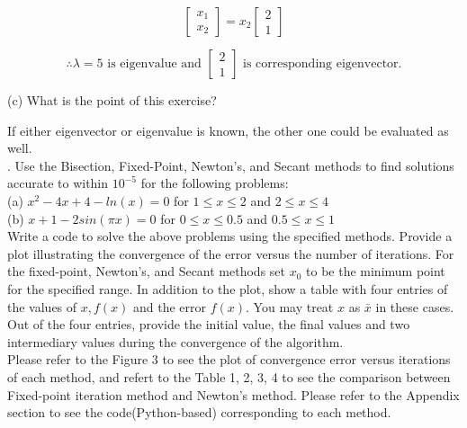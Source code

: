 \documentclass{article} %
\begin{document}
{    \[
        \begin{bmatrix}
        x_1 \\
        x_2 
        \end{bmatrix}
        =
        x_2
        \begin{bmatrix}
        2 \\
        1 
        \end{bmatrix}
    \]

    \[
        \therefore \lambda = 5 \text{ is eigenvalue and } 
        \begin{bmatrix}
            2 \\
            1
        \end{bmatrix} \text{ is corresponding eigenvector.}
    \]

    \noindent (c) What is the point of this exercise?

    If either eigenvector or eigenvalue is known, the other one could be evaluated as well.\\

    . Use the Bisection, Fixed-Point, Newton’s, and Secant methods to find solutions accurate to within 
    $ 10^{-5} $ for the following problems: \\
    (a) $ x^2 - 4x + 4 - ln(x) = 0 $ for $ 1 \leq x \leq 2 $ and $ 2 \leq x \leq 4 $ \\
    (b) $ x + 1 - 2sin(\pi x) = 0 $ for $ 0 \leq x \leq 0.5 $ and $ 0.5 \leq x \leq 1 $ \\
    Write a code to solve the above problems using the specified methods. Provide a plot illustrating the
    convergence of the error versus the number of iterations. For the fixed-point, Newton’s, and Secant
    methods set $ x_0 $ to be the minimum point for the specified range. In addition to the plot, show a table
    with four entries of the values of $ x, f(x) $ and the error $ f(x) $. You may treat $ x $ as $ \bar{x} $ in these cases. Out
    of the four entries, provide the initial value, the final values and two intermediary values during the
    convergence of the algorithm. \\

    Please refer to the Figure 3 to see the plot of convergence error versus iterations of each method, 
    and refert to the Table 1, 2, 3, 4 to see the comparison between Fixed-point iteration method and Newton's method.
    Please refer to the Appendix section to see the code(Python-based) corresponding to each method.

}
\end{document}
